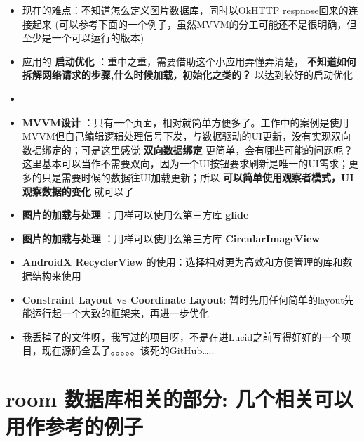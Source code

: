 \documentclass[9pt, b5paper]{article}
\begin{document}
\begin{itemize}
\item 现在的难点：不知道怎么定义图片数据库，同时以OkHTTP respnose回来的连接起来 (可以参考下面的一个例子，虽然MVVM的分工可能还不是很明确，但至少是一个可以运行的版本)
\item 应用的 \textbf{启动优化} ：重中之重，需要借助这个小应用弄懂弄清楚， \textbf{不知道如何拆解网络请求的步骤,什么时候加载，初始化之类的？} 以达到较好的启动优化
\item 
\item \textbf{MVVM设计} ：只有一个页面，相对就简单方便多了。工作中的案例是使用MVVM但自己编辑逻辑处理信号下发，与数据驱动的UI更新，没有实现双向数据绑定的；可是这里感觉 \textbf{双向数据绑定} 更简单，会有哪些可能的问题呢？这里基本可以当作不需要双向，因为一个UI按钮要求刷新是唯一的UI需求；更多的只是需要时候的数据往UI加载更新；所以 \textbf{可以简单使用观察者模式，UI观察数据的变化} 就可以了
\item \textbf{图片的加载与处理} ：用样可以使用么第三方库 \textbf{glide}
\item \textbf{图片的加载与处理} ：用样可以使用么第三方库 \textbf{CircularImageView}
\item \textbf{AndroidX RecyclerView} 的使用：选择相对更为高效和方便管理的库和数据结构来使用
\item \textbf{Constraint Layout vs Coordinate Layout}: 暂时先用任何简单的layout先能运行起一个大致的框架来，再进一步优化
\item 我丢掉了的文件呀，我写过的项目呀，不是在进Lucid之前写得好好的一个项目，现在源码全丢了。。。。。该死的GitHub\ldots{}..
\end{itemize}

\section{room 数据库相关的部分: 几个相关可以用作参考的例子}
\label{sec-3}
\end{document}
